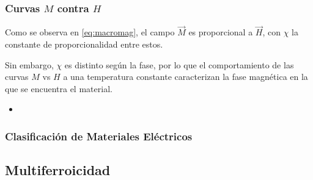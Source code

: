 \documentclass[../main.tex]{subfiles}
\begin{document}
\subsubsection{Curvas $M$ contra $H$}
Como se observa en \ref{eq:macromag}, el campo $\vec{M}$ es proporcional a $\vec{H}$, con $\chi$ la constante de proporcionalidad entre estos.

Sin embargo, $\chi$ es distinto según la fase, por lo que el comportamiento de las curvas $M$ vs $H$ a una temperatura constante caracterizan la fase magnética en la que se encuentra el material.

\begin{itemize}
    \item 
\end{itemize}
\subsubsection{Clasificación de Materiales Eléctricos}
\subsection{Multiferroicidad}
\end{document}
